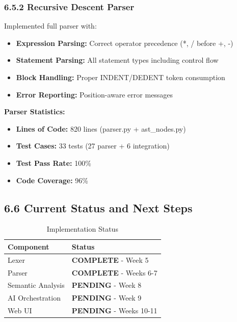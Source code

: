 \documentclass[a4paper,11pt]{article}
\newcommand{\statusgood}[1]{\colorbox{green!20}{\textbf{#1}}}
\newcommand{\statuspending}[1]{\colorbox{yellow!20}{\textbf{#1}}}
\begin{document}
\subsubsection{6.5.2 Recursive Descent Parser}

Implemented full parser with:
\begin{itemize}[leftmargin=*]
    \item \textbf{Expression Parsing:} Correct operator precedence (*, / before +, -)
    \item \textbf{Statement Parsing:} All statement types including control flow
    \item \textbf{Block Handling:} Proper INDENT/DEDENT token consumption
    \item \textbf{Error Reporting:} Position-aware error messages
\end{itemize}

\textbf{Parser Statistics:}
\begin{itemize}[leftmargin=*]
    \item \textbf{Lines of Code:} 820 lines (parser.py + ast\_nodes.py)
    \item \textbf{Test Cases:} 33 tests (27 parser + 6 integration)
    \item \textbf{Test Pass Rate:} 100\%
    \item \textbf{Code Coverage:} 96\%
\end{itemize}

\subsection{6.6 Current Status and Next Steps}

\begin{table}[H]
\centering
\begin{tabularx}{\textwidth}{|l|X|}
\hline
\rowcolor{blue!10}
\textbf{Component} & \textbf{Status} \\
\hline
Lexer & \statusgood{COMPLETE} - Week 5 \\
\hline
Parser & \statusgood{COMPLETE} - Weeks 6-7 \\
\hline
Semantic Analysis & \statuspending{PENDING} - Week 8 \\
\hline
AI Orchestration & \statuspending{PENDING} - Week 9 \\
\hline
Web UI & \statuspending{PENDING} - Weeks 10-11 \\
\hline
\end{tabularx}
\caption{Implementation Status}
\end{table}
\end{document}
